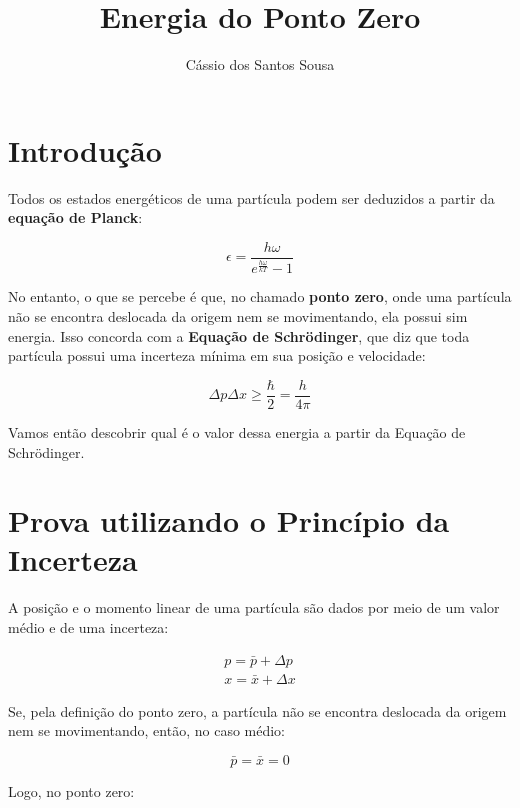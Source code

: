 \documentclass[11pt, a4paper]{article}
\title{Energia do Ponto Zero}
\author{Cássio dos Santos Sousa}
\begin{document}
\maketitle

\section{Introdução}

Todos os estados energéticos de uma partícula podem ser deduzidos a partir da \textbf{equação de Planck}:

\begin{equation}
    \epsilon = \frac{h\omega}{e^{\frac{h\omega}{kT}} - 1}
    \label{eq1}
\end{equation}

No entanto, o que se percebe é que, no chamado \textbf{ponto zero}, onde uma partícula não se encontra deslocada da origem nem se movimentando, ela possui sim energia. Isso concorda com a \textbf{Equação de Schr\"odinger}, que diz que toda partícula possui uma incerteza mínima em sua posição e velocidade:

\begin{equation}
    \Delta p \Delta x \geq \frac{\hbar}{2} = \frac{h}{4\pi}
    \label{eq2}
\end{equation}

Vamos então descobrir qual é o valor dessa energia a partir da Equação de Schr\"odinger.

\section{Prova utilizando o Princípio da Incerteza}

A posição e o momento linear de uma partícula são dados por meio de um valor médio e de uma incerteza:

\begin{eqnarray}
    p = \bar{p} + \Delta p  \label{eq3} \\
    x = \bar{x} + \Delta x  \label{eq4}
\end{eqnarray}

Se, pela definição do ponto zero, a partícula não se encontra deslocada da origem nem se movimentando, então, no caso médio:

\begin{equation}
    \bar{p} = \bar{x} = 0   \label{eq5}
\end{equation}

Logo, no ponto zero:
\end{document}
